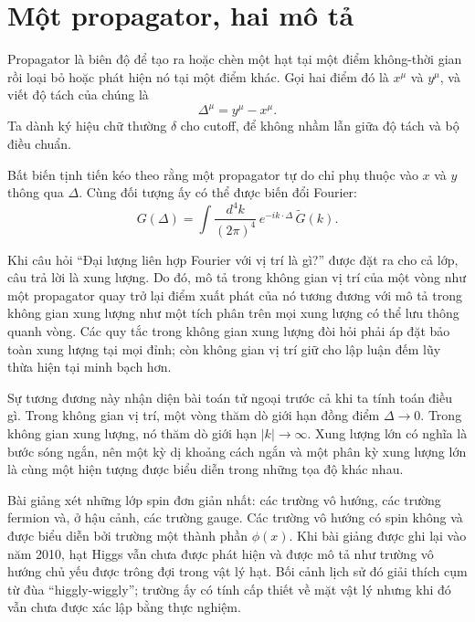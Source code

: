 \section{Một propagator, hai mô tả}

Propagator là biên độ để tạo ra hoặc chèn một hạt tại một điểm không-thời gian rồi loại bỏ hoặc phát hiện nó tại một điểm khác. Gọi hai điểm đó là \(x^\mu\) và \(y^\mu\), và viết độ tách của chúng là
\begin{equation}
\Delta^\mu=y^\mu-x^\mu.
\end{equation}
Ta dành ký hiệu chữ thường \(\delta\) cho cutoff, để không nhầm lẫn giữa độ tách và bộ điều chuẩn.

Bất biến tịnh tiến kéo theo rằng một propagator tự do chỉ phụ thuộc vào \(x\) và \(y\) thông qua \(\Delta\). Cùng đối tượng ấy có thể được biến đổi Fourier:
\begin{equation}
G(\Delta)
=\int\frac{d^4k}{(2\pi)^4}\,e^{-ik\cdot\Delta}\,\widetilde G(k).
\end{equation}

Khi câu hỏi ``Đại lượng liên hợp Fourier với vị trí là gì?'' được đặt ra cho cả lớp, câu trả lời là xung lượng. Do đó, mô tả trong không gian vị trí của một vòng như một propagator quay trở lại điểm xuất phát của nó tương đương với mô tả trong không gian xung lượng như một tích phân trên mọi xung lượng có thể lưu thông quanh vòng. Các quy tắc trong không gian xung lượng đòi hỏi phải áp đặt bảo toàn xung lượng tại mọi đỉnh; còn không gian vị trí giữ cho lập luận đếm lũy thừa hiện tại minh bạch hơn.

Sự tương đương này nhận diện bài toán tử ngoại trước cả khi ta tính toán điều gì. Trong không gian vị trí, một vòng thăm dò giới hạn đồng điểm \(\Delta\to0\). Trong không gian xung lượng, nó thăm dò giới hạn \(|k|\to\infty\). Xung lượng lớn có nghĩa là bước sóng ngắn, nên một kỳ dị khoảng cách ngắn và một phân kỳ xung lượng lớn là cùng một hiện tượng được biểu diễn trong những tọa độ khác nhau.

Bài giảng xét những lớp spin đơn giản nhất: các trường vô hướng, các trường fermion và, ở hậu cảnh, các trường gauge. Các trường vô hướng có spin không và được biểu diễn bởi trường một thành phần \(\phi(x)\). Khi bài giảng được ghi lại vào năm 2010, hạt Higgs vẫn chưa được phát hiện và được mô tả như trường vô hướng chủ yếu được trông đợi trong vật lý hạt. Bối cảnh lịch sử đó giải thích cụm từ đùa ``higgly-wiggly''; trường ấy có tính cấp thiết về mặt vật lý nhưng khi đó vẫn chưa được xác lập bằng thực nghiệm.

